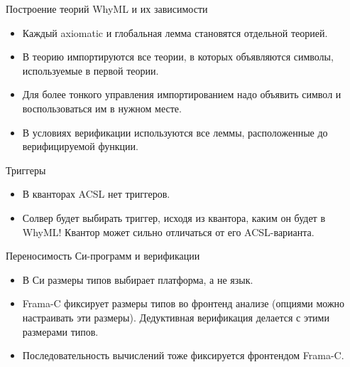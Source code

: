 \documentclass[hyperref={unicode=true}]{beamer}
\begin{document}
    \begin{frame}{Построение теорий WhyML и их зависимости}
    \begin{itemize}
    \item
    Каждый axiomatic и глобальная лемма становятся
    отдельной теорией.
    \item
    В теорию импортируются все теории, в которых
    объявляются символы, используемые в первой теории.
    \item
    Для более тонкого управления импортированием
    надо объявить символ и воспользоваться им в нужном месте.
    \item
    В условиях верификации используются все леммы,
    расположенные до верифицируемой функции.
    \end{itemize}
    \end{frame}

    \begin{frame}{Триггеры}
    \begin{itemize}
    \item
    В кванторах ACSL нет триггеров.
    \item
    Солвер будет выбирать триггер, исходя из квантора, каким
    он будет в WhyML! Квантор может сильно отличаться
    от его ACSL-варианта.
    \end{itemize}
    \end{frame}

    \begin{frame}{Переносимость Си-программ и верификации}
    \begin{itemize}
    \item
    В Си размеры типов выбирает платформа, а не язык.
    \item
    Frama-C фиксирует размеры типов во фронтенд анализе
    (опциями можно настраивать эти размеры). Дедуктивная
    верификация делается с этими размерами типов.
    \item
    Последовательность вычислений тоже фиксируется
    фронтендом Frama-C.
    \end{itemize}
    \end{frame}
\end{document}
